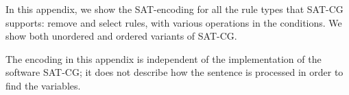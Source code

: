 \def\sobre{\text{\em sobre}}
\def\una{\text{\em una}}
\def\aproximacion{\text{ \em aproximaci\'{o}n}}
\def\mas{\text{\em m\'{a}s}}
\def\cientifica{\text{\em cient\'{\i}fica}}


\def\vPrsPThree{\text{\sc PrsP3}}
\def\vPrsPOne{\text{\sc PrsP1}}
\def\vImpPThree{\text{\sc ImpP3}}
\def\adj{{\text{\sc Adj}}}
\def\adv{{\text{\sc Adv}}}
\def\n{\text{\sc N}}
\def\pr{{\text{\sc Pr}}}
\def\prn{{\text{\sc Prn}}}
\def\det{{\text{\sc Det}}}
\def\notDet{{\neg \text{\sc Det}}}
\def\any{{\text{Any}}}


\def\sobrePr{\sobre_\pr}
\def\sobreN{\sobre_\n}

\def\unaNotDet{\una_\notDet}
\def\unaAny{\una_\any}
\def\unaPrn{\una_\prn}
\def\unaDet{\una_\det}
\def\unaPrsPThree{\una_\vPrsPThree}
\def\unaPrsPOne{\una_\vPrsPOne}
\def\unaImp{\una_\vImpPThree}
\def\aproximacionN{\aproximacion_\n}
\def\masAdv{\mas_\adv}
\def\masAdj{\mas_\adj}
\def\cientificaAdj{\cientifica_\adj}
\def\cientificaN{\cientifica_\n}

\def\cgrule#1{\noindent {\bf  #1 }}
\def\eqdef{\Coloneqq}
\def\impl{\quad\Longrightarrow\quad}

\def\ob#1{\overbrace{ #1 \rule{0pt}{2ex}}}







\noindent In this appendix, we show the SAT-encoding for all the rule types that 
SAT-CG supports: {\sc remove} and {\sc select} rules, with various operations in the conditions. We show both unordered and ordered variants of SAT-CG.

The encoding in this appendix is independent of the implementation of the software SAT-CG; it does not describe how the sentence is processed in order to find the variables.

